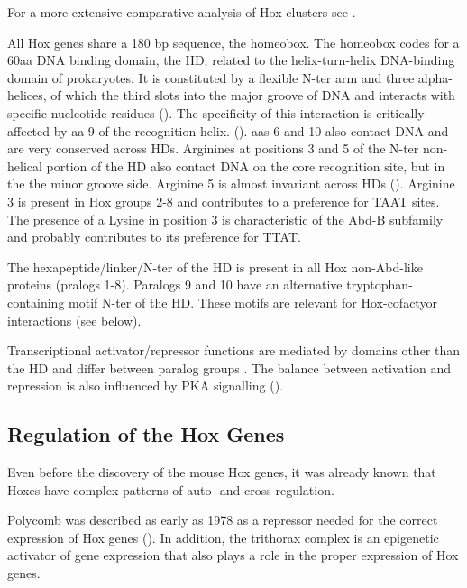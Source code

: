 
For a more extensive comparative analysis of Hox clusters see \cite{Duboule2007}.

All Hox genes share a 180 bp sequence, the homeobox. The homeobox codes for a 60aa DNA binding domain, the \ac{HD}, related to the helix-turn-helix DNA-binding domain of prokaryotes. It is constituted by a flexible \ac{N-ter} arm and three alpha-helices, of which the third slots into the major groove of DNA and interacts with specific nucleotide residues (\cite{Treisman1992}). The specificity of this interaction is critically affected by \ac{aa} 9 of the recognition helix. (\cite{Treisman1992}). \acp{aa} 6 and 10 also contact DNA and are very conserved across \acp{HD}. Arginines at positions 3 and 5 of the \ac{N-ter} non-helical portion of the \ac{HD} also contact DNA on the core recognition site, but in the the minor groove side. Arginine 5 is almost invariant across \acp{HD} (\cite{Treisman1992}). Arginine 3 is present in Hox groups 2-8 and contributes to a preference for TAAT sites. The presence of a Lysine in position 3 is characteristic of the \ac{Abd-B} subfamily and probably contributes to its preference for TTAT.

The hexapeptide/linker/\ac{N-ter} of the \ac{HD} is present in all Hox non-Abd-like proteins (pralogs 1-8). Paralogs 9 and 10 have an alternative tryptophan-containing motif \ac{N-ter} of the \ac{HD}. These motifs are relevant for Hox-cofactyor interactions (see below).

Transcriptional activator/repressor functions are mediated by domains other than the \ac{HD} and differ between paralog groups \cite{ref}. The balance between activation and repression is also influenced by \ac{PKA} signalling (\cite{Saleh2000a}).

\subsection{Regulation of the Hox Genes}

Even before the discovery of the mouse Hox genes, it was already known that Hoxes have complex patterns of auto- and cross-regulation. 


Polycomb was described as early as 1978 as a repressor needed for the correct expression of Hox genes (\cite{Lewis1978}). In addition, the trithorax complex is an epigenetic activator of gene expression that also plays a role in the proper expression of Hox genes.%

